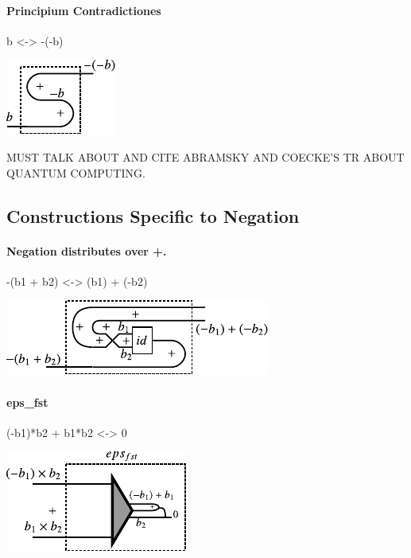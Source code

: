 \documentclass[preprint]{sigplanconf}
\begin{document}
\paragraph*{Principium Contradictiones}

{{b <-> -(-b)}}

\begin{center}
  \includegraphics{diagrams/double_neg.pdf}
\end{center}

MUST TALK ABOUT AND CITE ABRAMSKY AND COECKE'S TR ABOUT QUANTUM
COMPUTING.


\subsection{Constructions Specific to Negation}
\label{sec:neg-constructions}

\paragraph*{Negation distributes over {{+}}. }

{{-(b1 + b2) <-> (b1) + (-b2)}}

\begin{center}
  \includegraphics{diagrams/dist_neg_plus.pdf}
\end{center}

\paragraph*{ {{eps_{fst} }} }

{{(-b1)*b2 + b1*b2 <-> 0}}

\begin{center}
  \includegraphics{diagrams/eps_fst.pdf}
\end{center}
\end{document}
